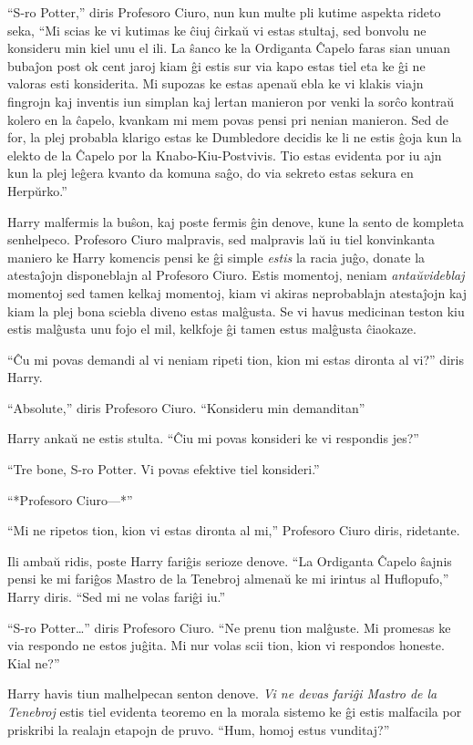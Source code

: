 ``S-ro Potter,'' diris Profesoro Ciuro, nun kun multe pli kutime
aspekta rideto seka, ``Mi scias ke vi kutimas ke ĉiuj ĉirkaŭ vi estas
stultaj, sed bonvolu ne konsideru min kiel unu el ili. La ŝanco ke la
Ordiganta Ĉapelo faras sian unuan bubaĵon post ok cent jaroj kiam ĝi
estis sur via kapo estas tiel eta ke ĝi ne valoras esti
konsiderita. Mi supozas ke estas apenaŭ ebla ke vi klakis viajn
fingrojn kaj inventis iun simplan kaj lertan manieron por venki la
sorĉo kontraŭ kolero en la ĉapelo, kvankam mi mem povas pensi pri nenian
manieron. Sed de for, la plej probabla klarigo estas ke Dumbledore
decidis ke li ne estis ĝoja kun la elekto de la Ĉapelo por la
Knabo-Kiu-Postvivis. Tio estas evidenta por iu ajn kun la plej leĝera
kvanto da komuna saĝo, do via sekreto estas sekura en Herpŭrko.''

Harry malfermis la buŝon, kaj poste fermis ĝin denove, kune la sento
de kompleta senhelpeco. Profesoro Ciuro malpravis, sed malpravis laŭ
iu tiel konvinkanta maniero ke Harry komencis pensi ke ĝi simple
\emph{estis} la racia juĝo, donate la atestaĵojn disponeblajn al
Profesoro Ciuro. Estis momentoj, neniam \emph{antaŭvideblaj} momentoj
sed tamen kelkaj momentoj, kiam vi akiras neprobablajn atestaĵojn kaj
kiam la plej bona sciebla diveno estas malĝusta. Se vi havus medicinan
teston kiu estis malĝusta unu fojo el mil, kelkfoje ĝi tamen estus
malĝusta ĉiaokaze.

``Ĉu mi povas demandi al vi neniam ripeti tion, kion mi estas dironta al vi?'' diris Harry.

``Absolute,'' diris Profesoro Ciuro. ``Konsideru min demanditan''

Harry ankaŭ ne estis stulta. ``Ĉiu mi povas konsideri ke vi respondis jes?''

``Tre bone, S-ro Potter. Vi povas efektive tiel konsideri.''

``*Profesoro Ciuro—*''

``Mi ne ripetos tion, kion vi estas dironta al mi,'' Profesoro Ciuro diris, ridetante.

Ili ambaŭ ridis, poste Harry fariĝis serioze denove. ``La Ordiganta
Ĉapelo ŝajnis pensi ke mi fariĝos Mastro de la Tenebroj
almenaŭ ke mi irintus al Huflopufo,'' Harry diris. ``Sed mi ne volas fariĝi iu.''

``S-ro Potter\ldots'' diris Profesoro Ciuro. ``Ne prenu tion
malĝuste. Mi promesas ke via respondo ne estos juĝita. Mi nur volas
scii tion, kion vi respondos honeste. Kial ne?''

Harry havis tiun malhelpecan senton denove. \emph{Vi ne devas fariĝi
Mastro de la Tenebroj} estis tiel evidenta teoremo en la morala
sistemo ke ĝi estis malfacila por priskribi la realajn etapojn de
pruvo. ``Hum, homoj estus vunditaj?''

